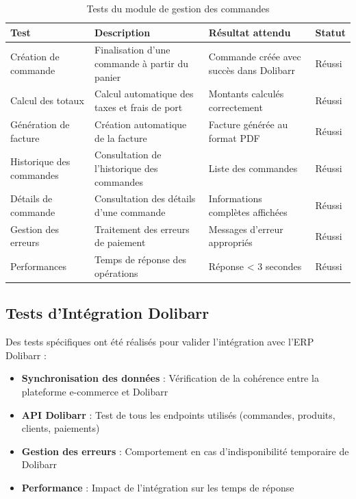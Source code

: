 \documentclass[12pt,a4paper]{report}
\begin{document}
\begin{table}[H]
\centering
\begin{tabularx}{\textwidth}{|X|X|X|X|}
\hline
\textbf{Test} & \textbf{Description} & \textbf{Résultat attendu} & \textbf{Statut} \\
\hline
Création de commande & Finalisation d'une commande à partir du panier & Commande créée avec succès dans Dolibarr & Réussi \\

\hline
Calcul des totaux & Calcul automatique des taxes et frais de port & Montants calculés correctement & Réussi \\

\hline
Génération de facture & Création automatique de la facture & Facture générée au format PDF & Réussi \\
\hline
Historique des commandes & Consultation de l'historique des commandes & Liste des commandes  & Réussi \\
\hline
Détails de commande & Consultation des détails d'une commande & Informations complètes affichées & Réussi \\
\hline
Gestion des erreurs & Traitement des erreurs de paiement & Messages d'erreur appropriés & Réussi \\
\hline
Performances & Temps de réponse des opérations & Réponse < 3 secondes & Réussi \\
\hline
\end{tabularx}
\caption{Tests du module de gestion des commandes}
\label{tab:orders_tests}
\end{table}

\subsection{Tests d'Intégration Dolibarr}
Des tests spécifiques ont été réalisés pour valider l'intégration avec l'ERP Dolibarr :

\begin{itemize}
\item \textbf{Synchronisation des données} : Vérification de la cohérence entre la plateforme e-commerce et Dolibarr
\item \textbf{API Dolibarr} : Test de tous les endpoints utilisés (commandes, produits, clients, paiements)
\item \textbf{Gestion des erreurs} : Comportement en cas d'indisponibilité temporaire de Dolibarr
\item \textbf{Performance} : Impact de l'intégration sur les temps de réponse
\end{itemize}
\end{document}
